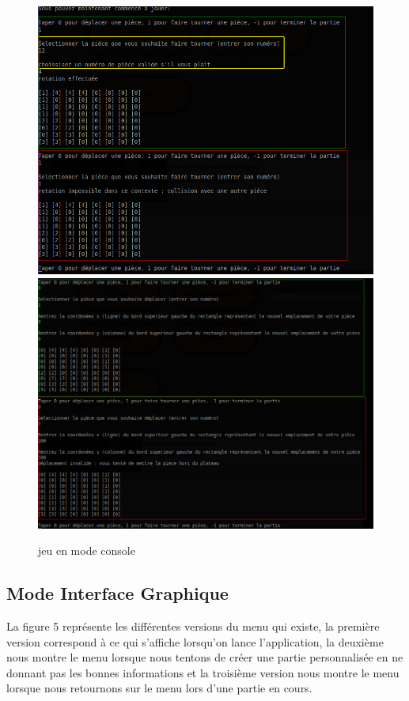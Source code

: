 \documentclass[12pt]{article}
\begin{document}
\begin{figure}[h]
\begin{center}
\includegraphics[scale=0.198]{Images/Rotation.png}
\includegraphics[scale=0.17]{Images/Deplacement.png}
\end{center}
\caption{jeu en mode console}
\end{figure}

\subsection{Mode Interface Graphique}
La figure 5 représente les différentes versions du menu qui existe, la première version correspond à ce qui s'affiche lorsqu'on lance l'application, la deuxième nous montre le menu lorsque nous tentons de créer une partie personnalisée en ne donnant pas les bonnes informations et la troisième version nous montre le menu lorsque nous retournons sur le menu lors d'une partie en cours.
\end{document}
